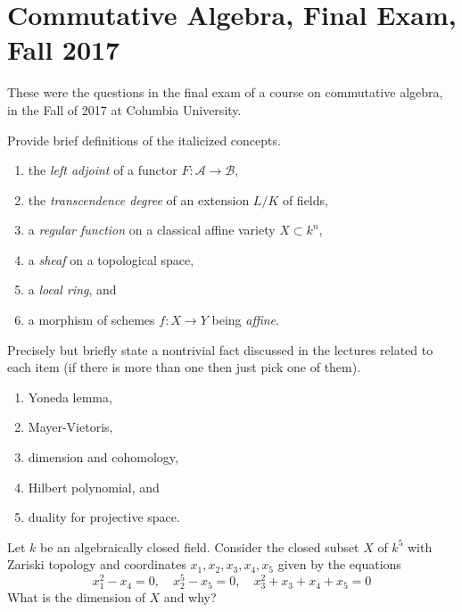 \section{Commutative Algebra, Final Exam, Fall 2017}
\label{section-final-exam-fall-2017}

\noindent
These were the questions in the final exam of a course on commutative algebra,
in the Fall of 2017 at Columbia University.

\begin{exercise}[Definitions]
\label{exercise-definitions-fall-2017}
Provide brief definitions of the italicized concepts.
\begin{enumerate}
\item the {\it left adjoint} of a functor $F : \mathcal{A} \to \mathcal{B}$,
\item the {\it transcendence degree} of an extension $L/K$ of fields,
\item a {\it regular function} on a classical affine variety
$X \subset k^n$,
\item a {\it sheaf} on a topological space,
\item a {\it local ring}, and
\item a morphism of schemes $f : X \to Y$ being {\it affine}.
\end{enumerate}
\end{exercise}

\begin{exercise}[Theorems]
\label{exercise-results-fall-2017}
Precisely but briefly state a nontrivial fact discussed in the lectures
related to each item (if there is more than one then just pick
one of them).
\begin{enumerate}
\item Yoneda lemma,
\item Mayer-Vietoris,
\item dimension and cohomology,
\item Hilbert polynomial, and
\item duality for projective space.
\end{enumerate}
\end{exercise}

\begin{exercise}
\label{exercise-compute-dimension}
Let $k$ be an algebraically closed field. Consider the closed subset
$X$ of $k^5$ with Zariski topology and coordinates $x_1, x_2, x_3, x_4, x_5$
given by the equations
$$
x_1^2 - x_4 = 0,\quad
x_2^5 - x_5 = 0,\quad
x_3^2 + x_3 + x_4 + x_5 = 0
$$
What is the dimension of $X$ and why?
\end{exercise}

